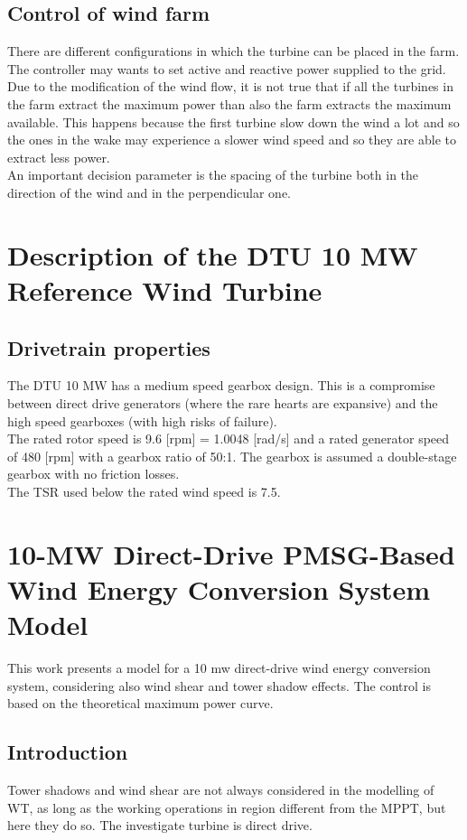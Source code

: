 \documentclass[]{article}
\begin{document}
\subsection{Control of wind farm}
There are different configurations in which the turbine can be placed in the farm. \\
The controller may wants to set active and reactive power supplied to the grid.\\
Due to the modification of the wind flow, it is not true that if all the turbines in the farm extract the maximum power than also the farm extracts the maximum available. This happens because the first turbine slow down the wind a lot and so the ones in the wake may experience a slower wind speed and so they are able to extract less power.\\
An important decision parameter is the spacing of the turbine both in the direction of the wind and in the perpendicular one. 

\section{Description of the DTU 10 MW Reference Wind Turbine}
\subsection{Drivetrain properties}
The DTU 10 MW has a medium speed gearbox design. This is a compromise between direct drive generators (where the rare hearts are expansive) and the high speed gearboxes (with high risks of failure).\\
The rated rotor speed is 9.6 [rpm] = 1.0048 [rad/s] and a rated generator speed of 480 [rpm] with a gearbox ratio of 50:1. The gearbox is assumed a double-stage gearbox with no friction losses.  \\
The TSR used below the rated wind speed is 7.5.\\ 

\section{10-MW Direct-Drive PMSG-Based Wind Energy Conversion System Model}
This work presents a model for a 10 mw direct-drive wind energy conversion system, considering also wind shear and tower shadow effects. The control is based on the theoretical maximum power curve.\\
\subsection{Introduction}
Tower shadows and wind shear are not always considered in the modelling of WT, as long as the working operations in region different from the MPPT, but here they do so. The investigate turbine is direct drive.
\end{document}
